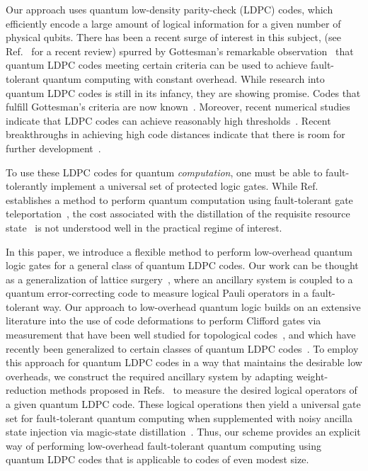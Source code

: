 \documentclass[reprint,
superscriptaddress,
 amsmath,amssymb,
 aps, longbibliography
]{revtex4-1}
\newcommand{\rev}[1]{{#1}}
\begin{document}
Our approach uses quantum low-density parity-check (LDPC) codes, which efficiently encode a large amount of logical information for a given number of physical qubits. There has been a recent surge of interest in this subject, (see Ref.~\cite{Breuckmann21} for a recent review) spurred by Gottesman's remarkable observation~\cite{Gottesman14} that quantum LDPC codes meeting certain criteria can be used to achieve fault-tolerant quantum computing with constant overhead.  While research into quantum LDPC codes is still in its infancy, they are showing promise.  Codes that fulfill Gottesman's criteria are now known~\cite{Fawzi20}. Moreover, recent numerical studies indicate that LDPC codes can achieve reasonably high thresholds~\cite{Panteleev19,Roffe20,Grospellier2021}. Recent breakthroughs in achieving high code distances indicate that there is room for further development~\cite{Hastings20,Panteleev20,Breuckmann2021a}.

To use these LDPC codes for quantum \emph{computation}, one must be able to fault-tolerantly implement a universal set of protected logic gates. While Ref.~\cite{Gottesman14} establishes a method to perform quantum computation using fault-tolerant gate teleportation~\cite{Knill2003}, the cost associated with the distillation of the requisite resource state~\cite{Zheng_2020} is not understood well in the practical regime of interest.



In this paper, we introduce a flexible method to perform low-overhead quantum logic gates for a general class of quantum LDPC codes.  Our work can be thought as a generalization of lattice surgery~\cite{Horsman12}, where an ancillary system is coupled to a quantum error-correcting code to measure logical Pauli operators in a fault-tolerant way. Our approach to low-overhead quantum logic builds on an extensive literature into the use of code deformations to perform Clifford gates via measurement that have been well studied for topological codes~\cite{Raussendorf07,Fowler12,Horsman12,Brown17,Litinski19,Vuillot19}, and which have recently been generalized to certain classes of quantum LDPC codes~\cite{Breuckmann17,Lavasani18,Krishna20,Krishna21}. To employ this approach for quantum LDPC codes in a way that maintains the desirable low overheads, we construct the required ancillary system by adapting weight-reduction methods proposed in Refs.~\cite{Hastings16,Hastings21} to measure the desired logical operators of a given quantum LDPC code. These logical operations then yield a universal gate set for fault-tolerant quantum computing when supplemented with noisy ancilla state injection via magic-state distillation~\cite{Bravyi05}. \rev{Thus, our scheme provides an explicit way of performing low-overhead fault-tolerant quantum computing using quantum LDPC codes that is applicable to codes of even modest size.}
\end{document}
